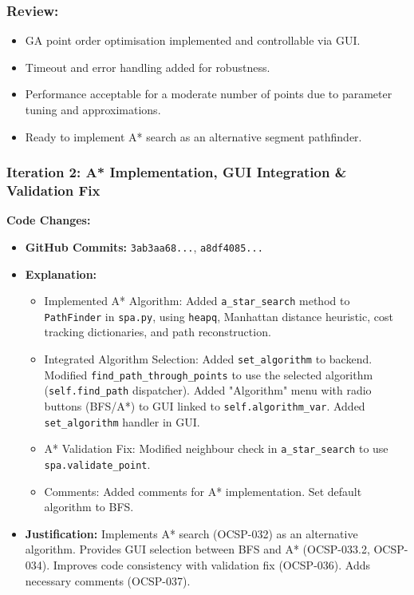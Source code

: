 \subsubsection{Review:}
\begin{itemize}
	\item GA point order optimisation implemented and controllable via GUI.
	\item Timeout and error handling added for robustness.
	\item Performance acceptable for a moderate number of points due to parameter tuning and approximations.
	\item Ready to implement A* search as an alternative segment pathfinder.
\end{itemize}

\subsubsection{Iteration 2: A* Implementation, GUI Integration \& Validation Fix}

\textbf{Code Changes:}
\begin{itemize}
	\item \textbf{GitHub Commits:} \verb|3ab3aa68...|, \verb|a8df4085...|
	\item \textbf{Explanation:}
	\begin{itemize}
		\item Implemented A* Algorithm: Added \verb|a_star_search| method to \verb|PathFinder| in \verb|spa.py|, using \verb|heapq|, Manhattan distance heuristic, cost tracking dictionaries, and path reconstruction.
		\item Integrated Algorithm Selection: Added \verb|set_algorithm| to backend. Modified \verb|find_path_through_points| to use the selected algorithm (\verb|self.find_path| dispatcher). Added "Algorithm" menu with radio buttons (BFS/A*) to GUI linked to \verb|self.algorithm_var|. Added \verb|set_algorithm| handler in GUI.
		\item A* Validation Fix: Modified neighbour check in \verb|a_star_search| to use \verb|spa.validate_point|.
		\item Comments: Added comments for A* implementation. Set default algorithm to BFS.
	\end{itemize}
	\item \textbf{Justification:} Implements A* search (OCSP-032) as an alternative algorithm. Provides GUI selection between BFS and A* (OCSP-033.2, OCSP-034). Improves code consistency with validation fix (OCSP-036). Adds necessary comments (OCSP-037).
\end{itemize}

